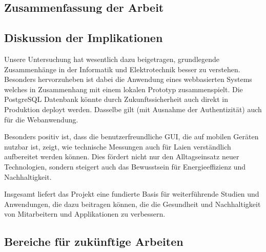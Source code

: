 \subsection{Zusammenfassung der Arbeit}



\subsection{Diskussion der Implikationen}

Unsere Untersuchung hat wesentlich dazu beigetragen, grundlegende Zusammenhänge in der Informatik und Elektrotechnik besser zu verstehen. Besonders hervorzuheben ist dabei die Anwendung eines webbasierten Systems welches in Zusammenhang mit einem lokalen Prototyp zusammenspielt. Die PostgreSQL Datenbank könnte durch Zukunftssicherheit auch direkt in Produktion deployt werden. Dasselbe gilt (mit Ausnahme der Authentizität) auch für die Webanwendung.

\vspace{1em}
\noindent Besonders positiv ist, dass die benutzerfreundliche GUI, die auf mobilen Geräten nutzbar ist, zeigt, wie technische Messungen auch für Laien verständlich aufbereitet werden können. Dies fördert nicht nur den Alltagseinsatz neuer Technologien, sondern steigert auch das Bewusstsein für Energieeffizienz und Nachhaltigkeit.

\vspace{1em}
\noindent Insgesamt liefert das Projekt eine fundierte Basis für weiterführende Studien und Anwendungen, die dazu beitragen können, die die Gesundheit und Nachhaltigkeit von Mitarbeitern und Applikationen zu verbessern.


\subsection{Bereiche für zukünftige Arbeiten}

